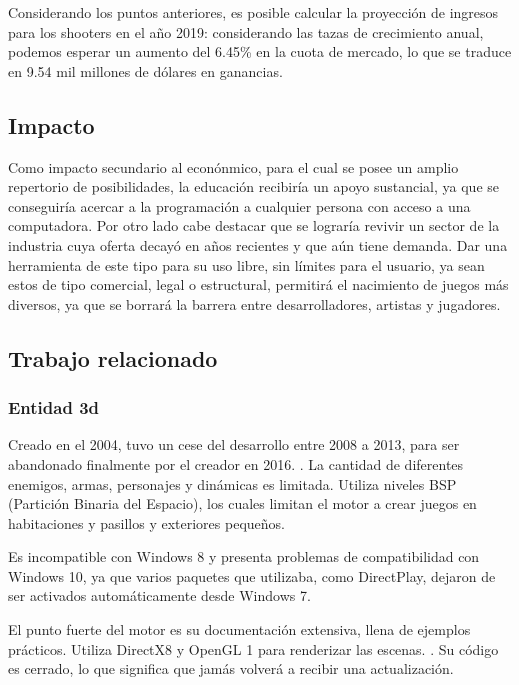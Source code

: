 \documentclass[]{article}
\begin{document}
Considerando los puntos anteriores, es posible calcular la proyecci\'on de ingresos para los shooters en el a\~no 2019: considerando las tazas de crecimiento anual, podemos esperar un aumento del 6.45\% en la cuota de mercado, lo que se traduce en 9.54 mil millones de d\'olares en ganancias. 

\subsection{Impacto}
Como impacto secundario al econ\'onmico, para el cual se posee un amplio repertorio de posibilidades, la educaci\'on recibir\'ia un apoyo sustancial, ya que se conseguir\'ia acercar a la programaci\'on a cualquier persona con acceso a una computadora. Por otro lado cabe destacar que se lograr\'ia revivir un sector de la industria cuya oferta decay\'o en a\~nos recientes y que a\'un tiene demanda. Dar una herramienta de este tipo para su uso libre, sin l\'imites para el usuario, ya sean estos de tipo comercial, legal o estructural, permitir\'a el nacimiento de juegos m\'as diversos, ya que se borrar\'a la barrera entre desarrolladores, artistas y jugadores.


\subsection{Trabajo relacionado}

\subsubsection{Entidad 3d}

Creado en el 2004, tuvo un cese del desarrollo entre 2008 a 2013, para ser abandonado finalmente por el creador en 2016. \cite{e3d}. La cantidad de diferentes enemigos, armas, personajes y din\'amicas es limitada. Utiliza niveles BSP (Partici\'on Binaria del Espacio), los cuales limitan el motor a crear juegos en habitaciones y pasillos y exteriores peque\~nos.  
 

Es incompatible con Windows 8 y presenta problemas de compatibilidad con Windows 10, ya que varios paquetes que utilizaba, como DirectPlay, dejaron de ser activados autom\'aticamente desde Windows 7. 



El punto fuerte del motor es su documentaci\'on extensiva, llena de ejemplos pr\'acticos.
Utiliza DirectX8 y OpenGL 1 para renderizar las escenas. \cite{e3d2}.
Su c\'odigo es cerrado, lo que significa que jam\'as volver\'a a recibir una actualizaci\'on. \cite{e3d3}
\end{document}
